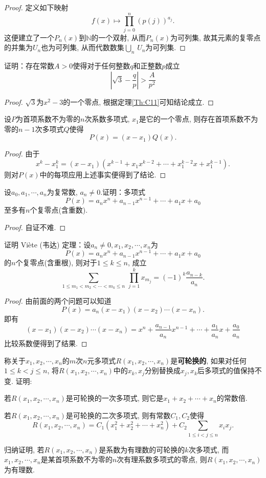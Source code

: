 \begin{quiza}
\begin{proof}
定义如下映射\[f(x)\mapsto\prod_{j=0}^{n}\left(p(j)\right)^{a_j}.\]
这便建立了一个\(P_n(x)\)到\(\mathbb{N}\)的一个双射, 从而\(P_n(x)\)为可列集, 故其元素的复零点的并集为\(U_n\)也为可列集, 从而代数数集\(\underset{n}{\bigcup}\,U_n\)为可列集.
\end{proof}
\woe 证明：存在常数\(A>0\)使得对于任何整数\(q\)和正整数\(p\)成立\[\left|\sqrt{3}-\frac{q}{p}\right|>\frac{A}{p^2}\]
\begin{proof}
\(\sqrt{3}\)为\(x^2-3\)的一个零点, 根据定理\ref{Th:C11}可知结论成立.
\end{proof}
\end{quiza}
\begin{quizb}
\woe 设\(P\)为首项系数不为零的\(n\)次系数多项式, \(x_1\)是它的一个零点, 则存在首项系数不为零的\(n-1\)次多项式\(Q\)使得\[P(x)=(x-x_1)Q(x).\]
\begin{proof}
由于\[x^k-x_1^k=(x-x_1)\left(x^{k-1}+x_1x^{k-2}+\cdots+x_1^{k-2}x+x_1^{k-1}\right).\]则对\(P(x)\)中的每项应用上述事实便得到了结论.
\end{proof}
\woe 设\(a_0,a_1,\cdots,a_n\)为复常数, \(a_n\ne 0\).证明：多项式\[P(x)=a_nx^n+a_{n-1}x^{n-1}+\cdots+a_1x+a_0\]至多有\(n\)个复零点(含重数).
\begin{proof}
自证不难.
\end{proof}
\woe 证明 Vi\`{e}te (韦达) 定理：设\(a_n\ne 0,x_1,x_2,\cdots,x_n\)为\[P(x)=a_nx^n+a_{n-1}x^{n-1}+\cdots+a_1x+a_0\]的\(n\)个复零点(含重根), 则对于\(1\leqslant k\leqslant n\), 成立 \[\sum_{1\leqslant m_1<m_2<\cdots<m_k\leqslant n}\,\prod_{j=1}^{k}x_{m_j}=(-1)^k \frac{a_{n-k}}{a_n}.\]
\begin{proof}
由前面的两个问题可以知道\[P(x)=a_n(x-x_1)(x-x_2)\cdots(x-x_n).\]即有\[(x-x_1)(x-x_2)\cdots(x-x_n)=x^n+\frac{a_{n-1}}{a_n}x^{n-1}+\cdots+\frac{a_1}{a_n}x+\frac{a_0}{a_n}\]比较系数便得到了结果.
\end{proof}
\woe 称关于\(x_1,x_2,\cdots,x_n\)的\(m\)次\(n\)元多项式\(R(x_1,x_2,\cdots,x_n)\)是\textbf{可轮换的}, 如果对任何\(1\leqslant k<j\leqslant n\), 将\(R(x_1,x_2,\cdots,x_n)\)中的\(x_k,x_j\)分别替换成\(x_j,x_k\)后多项式的值保持不变. 证明: 
\begin{quizs}
\item 若\(R(x_1,x_2,\cdots,x_n)\)是可轮换的一次多项式, 则它是\(x_1+x_2+\cdots+x_n\)的常数倍.
\item 若\(R(x_1,x_2,\cdots,x_n)\)是可轮换的二次多项式, 则有常数\(C_1,C_2\)使得\[R(x_1,x_2,\cdots,x_n)=C_1(x_1^2+x_2^2+\cdots+x_n^2)+C_2\sum_{1\leqslant i<j\leqslant n }x_ix_j.\]
\item 归纳证明, 若\(R(x_1,x_2,\cdots,x_n)\)是\textcolor{green!50!black}{系数为有理数的}可轮换的\(k\)次多项式, 而\(x_1,x_2,\cdots,x_n\)是某首项系数不为零的\(n\)次有理系数多项式的零点, 则\(R(x_1,x_2,\cdots,x_n)\)为有理数.

\end{quizs}
\end{quizb}
